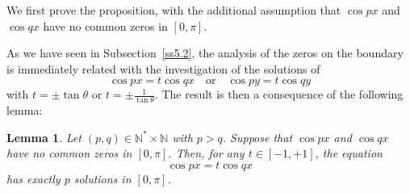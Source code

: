 \documentclass[a4paper,reqno,11pt]{amsart}
\newtheorem{lemma}[thm]{Lemma}
\theoremstyle{remark}
\theoremstyle{definition}
\numberwithin{equation}{section}
\begin{document}
We first  prove the proposition, with the additional assumption that $\cos px$ 
and $\cos qx$ have no common zeros in $ [0,\pi]$.

As we have seen in Subsection~\ref{ss5.2}, the analysis of the zeros on 
the boundary is immediately related with the investigation of the solutions of
\[
 \cos px = t \cos qx \quad \text{or}\quad 
 \cos py =t \cos qy 
\]
with $t = \pm \tan \theta$ or $t= \pm \frac{1}{\tan \theta}$.
The result is then a consequence of the following lemma:
\begin{lemma}
 Let $(p,q)\in \mathbb N^*\times \mathbb N$ with $p>q$. Suppose that 
$\cos px$ and $\cos qx$ have no common zeros in $ [0,\pi]$. Then,  
for any $t\in [-1,+1]$, the equation
\[
\cos px =  t \cos qx
\]
has exactly $p$ solutions in $[0,\pi]$.
\end{lemma}
\end{document}
